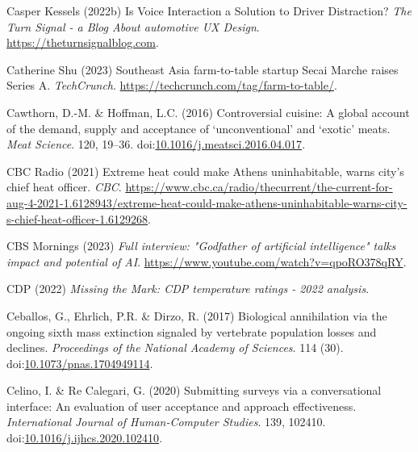 \documentclass[
  letterpaper,
  DIV=11,
  numbers=noendperiod]{scrartcl}
\newlength{\cslhangindent}
\newenvironment{CSLReferences}[2] %
 {\begin{list}{}{%
  \setlength{\itemindent}{0pt}
  \setlength{\leftmargin}{0pt}
  \setlength{\parsep}{0pt}
  \ifodd #1
   \setlength{\leftmargin}{\cslhangindent}
   \setlength{\itemindent}{-1\cslhangindent}
  \fi
  \setlength{\itemsep}{#2\baselineskip}}}
 {\end{list}}
\begin{document}
\begin{CSLReferences}{0}{1}
Casper Kessels (2022b) Is {Voice Interaction} a {Solution} to {Driver
Distraction}? \emph{The Turn Signal - a Blog About automotive UX
Design}. \url{https://theturnsignalblog.com}.

Catherine Shu (2023) Southeast {Asia} farm-to-table startup {Secai
Marche} raises {Series A}. \emph{TechCrunch}.
\url{https://techcrunch.com/tag/farm-to-table/}.

Cawthorn, D.-M. \& Hoffman, L.C. (2016) Controversial cuisine: {A}
global account of the demand, supply and acceptance of
{`unconventional'} and {`exotic'} meats. \emph{Meat Science}. 120,
19--36.
doi:\href{https://doi.org/10.1016/j.meatsci.2016.04.017}{10.1016/j.meatsci.2016.04.017}.

CBC Radio (2021) Extreme heat could make {Athens} uninhabitable, warns
city's chief heat officer. \emph{CBC}.
\url{https://www.cbc.ca/radio/thecurrent/the-current-for-aug-4-2021-1.6128943/extreme-heat-could-make-athens-uninhabitable-warns-city-s-chief-heat-officer-1.6129268}.

CBS Mornings (2023) \emph{Full interview: "{Godfather} of artificial
intelligence" talks impact and potential of {AI}}.
\url{https://www.youtube.com/watch?v=qpoRO378qRY}.

CDP (2022) \emph{Missing the {Mark}: {CDP} temperature ratings - 2022
analysis}.

Ceballos, G., Ehrlich, P.R. \& Dirzo, R. (2017) Biological annihilation
via the ongoing sixth mass extinction signaled by vertebrate population
losses and declines. \emph{Proceedings of the National Academy of
Sciences}. 114 (30).
doi:\href{https://doi.org/10.1073/pnas.1704949114}{10.1073/pnas.1704949114}.

Celino, I. \& Re Calegari, G. (2020) Submitting surveys via a
conversational interface: {An} evaluation of user acceptance and
approach effectiveness. \emph{International Journal of Human-Computer
Studies}. 139, 102410.
doi:\href{https://doi.org/10.1016/j.ijhcs.2020.102410}{10.1016/j.ijhcs.2020.102410}.


\end{CSLReferences}
\end{document}
